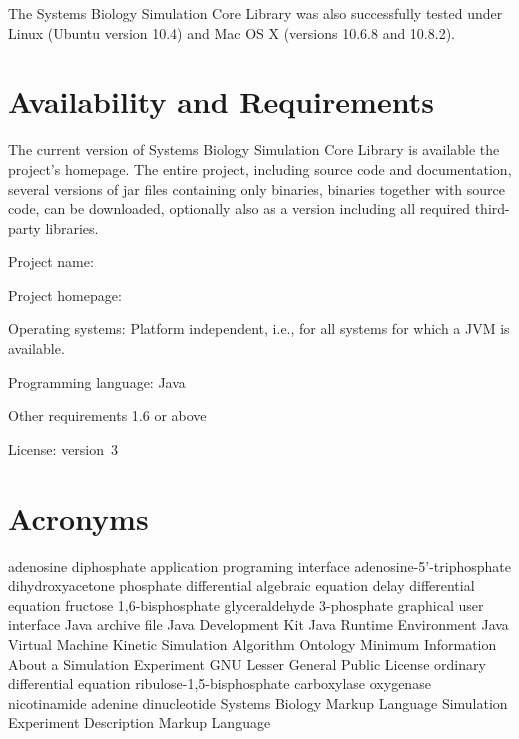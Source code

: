 \documentclass[10pt]{bmc_article}
\newenvironment{bmcformat}{\begin{raggedright}\baselineskip20pt\sloppy\setboolean{publ}{false}}{\end{raggedright}\baselineskip20pt\sloppy}
\begin{document}
\begin{bmcformat}
The Systems Biology Simulation Core Library was also successfully 
tested under Linux (Ubuntu version 10.4) and Mac OS X (versions 10.6.8 and 10.8.2).

\section*{Availability and Requirements}

The current version of Systems Biology Simulation Core Library is available
 the project's homepage.
The entire project, including source code and documentation, several versions of
jar files containing only binaries, binaries together with source code, can be
downloaded, optionally also as a version including all required third-party
libraries.
\begin{description}
  \item{Project name:}         
  \item{Project homepage:}     
  \item{Operating systems:}    Platform independent, i.e., for all systems for which a JVM is available.
  \item{Programming language:} Java\texttrademark
  \item{Other requirements}     1.6 or above
  \item{License:}               version~3
\end{description}

\section*{Acronyms}
\begin{acronym}
         {adenosine diphosphate}
         {application programing interface}
         {adenosine-5'-triphosphate}
        {dihydroxyacetone phosphate}
         {differential algebraic equation}
         {delay differential equation}
      {fructose 1,6-bisphosphate}
        {glyceraldehyde 3-phosphate}
         {graphical user interface}
         {Java archive file}
         {Java Development Kit}
         {Java Runtime Environment}
         {Java Virtual Machine}
       {Kinetic Simulation Algorithm Ontology}
       {Minimum Information About a Simulation Experiment}
        {GNU Lesser General Public License}
         {ordinary differential equation}
     {ribulose-1,5-bisphosphate carboxylase oxygenase}
     {nicotinamide adenine dinucleotide}
        {Systems Biology Markup Language}
      {Simulation Experiment Description Markup Language}
\end{acronym}



\end{bmcformat}
\end{document}
